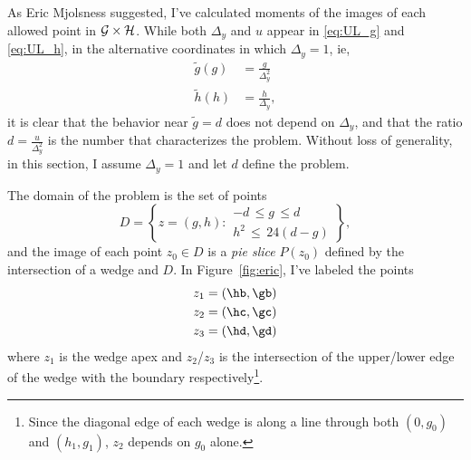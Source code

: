 \documentclass[twocolumn]{article}
\begin{document}
As Eric Mjolsness suggested, I've calculated moments of the images of
each allowed point in ${\cal G} \times {\cal H}$.  While both
$\Delta_y$ and $u$ appear in \eqref{eq:UL_g} and \eqref{eq:UL_h}, in
the alternative coordinates in which $\Delta_y=1$, ie,
\begin{align*}
  \tilde g(g) &= \frac{g}{\Delta_y^2} \\
  \tilde h(h) &= \frac{h}{\Delta_y},
\end{align*}
it is clear that the behavior near $\tilde g=d$ does not depend on
$\Delta_y$, and that the ratio $d = \frac{u}{\Delta_y^2}$ is the
number that characterizes the problem.  Without loss of generality, in
this section, I assume $\Delta_y=1$ and let $d$ define the problem.

The domain of the problem is the set of points
\begin{equation*}
  D = \left\{ z = (g,h) :
    \begin{array}{l}
      -d \, \leq g \, \leq d \\
      h^2\, \leq \, 24(d-g)
    \end{array}
    \right\},
\end{equation*}
and the image of each point $z_0 \in D$ is a \emph{pie slice} $P(z_0)$
defined by the intersection of a wedge and $D$.  In
Figure~\ref{fig:eric}, I've labeled the points
\begin{align*}
  z_1 &= \left( \hb, \gb \right) \\
  z_2 &= \left( \hc, \gc \right) \\
  z_3 &= \left( \hd, \gd \right)
\end{align*}
where $z_1$ is the wedge apex and $z_2$/$z_3$ is the intersection of
the upper/lower edge of the wedge with the boundary
respectively\footnote{Since the diagonal edge of each wedge is along a
  line through both $(0,g_0)$ and $(h_1,g_1)$, $z_2$ depends on $g_0$
  alone.}.
\end{document}
